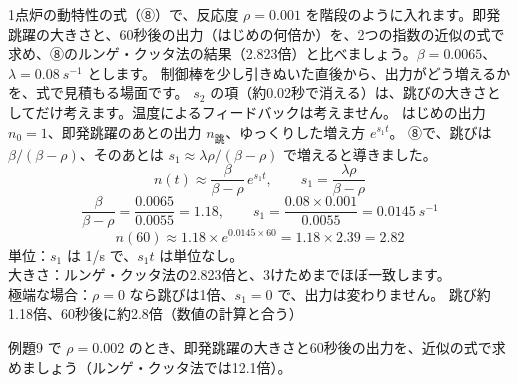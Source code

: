 \label{ph:原-15:ex9}
\begin{phreidai}
1点炉の動特性の式（⑧）で、反応度 $\rho=0.001$ を階段のように入れます。即発跳躍の大きさと、60秒後の出力（はじめの何倍か）を、2つの指数の近似の式で求め、⑧のルンゲ・クッタ法の結果（2.823倍）と比べましょう。$\beta=0.0065$、$\lambda=\qty{0.08}{s^{-1}}$ とします。
\phbamen
制御棒を少し引きぬいた直後から、出力がどう増えるかを、式で見積もる場面です。
\phmushi
$s_2$ の項（約0.02秒で消える）は、跳びの大きさとしてだけ考えます。温度によるフィードバックは考えません。
\phzu
はじめの出力 $n_0=1$、即発跳躍のあとの出力 $n_{\text{跳}}$、ゆっくりした増え方 $e^{s_1t}$。
\phriyu
⑧で、跳びは $\beta/(\beta-\rho)$、そのあとは $s_1\approx\lambda\rho/(\beta-\rho)$ で増えると導きました。
\phtateru
\[ n(t)\approx\frac{\beta}{\beta-\rho}\,e^{s_1t},\qquad s_1=\frac{\lambda\rho}{\beta-\rho} \]
\phtoku
\[ \frac{\beta}{\beta-\rho}=\frac{0.0065}{0.0055}=1.18,\qquad s_1=\frac{0.08\times0.001}{0.0055}=\qty{0.0145}{s^{-1}} \]
\[ n(60)\approx1.18\times e^{0.0145\times60}=1.18\times2.39=2.82 \]
\phtashikame
単位：$s_1$ は 1/s で、$s_1t$ は単位なし。\\
大きさ：ルンゲ・クッタ法の2.823倍と、3けためまでほぼ一致します。\\
極端な場合：$\rho=0$ なら跳びは1倍、$s_1=0$ で、出力は変わりません。
\kotae 跳び約1.18倍、60秒後に約2.8倍（数値の計算と合う）
\end{phreidai}
\begin{jibun}
例題9 で $\rho=0.002$ のとき、即発跳躍の大きさと60秒後の出力を、近似の式で求めましょう（ルンゲ・クッタ法では12.1倍）。
\end{jibun}

